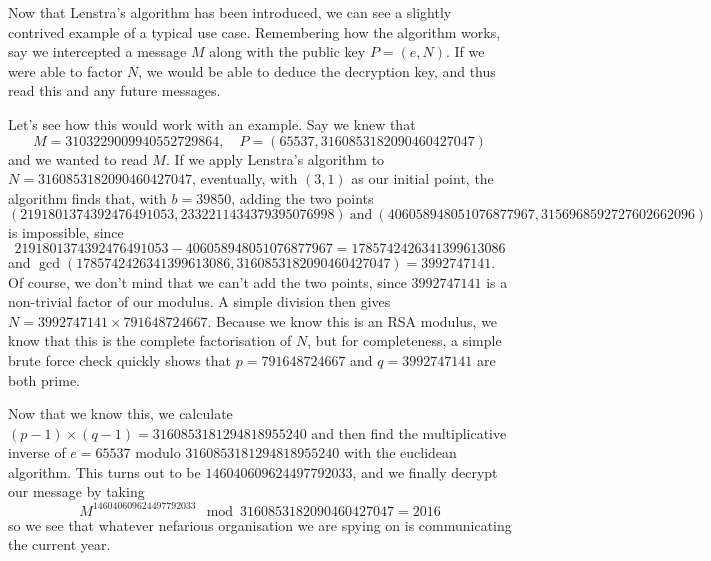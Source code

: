 
Now that Lenstra's algorithm has been introduced, we can see a slightly contrived example of a typical use case. Remembering how the algorithm works, say we intercepted a message $M$ along with the public key $P = (e,N)$. If we were able to factor $N$, we would be able to deduce the decryption key, and thus read this and any future messages. 

Let's see how this would work with an example. Say we knew that
$$ M = 3103229009940552729864,\quad P = (65537, 3160853182090460427047) $$
and we wanted to read $M$. If we apply Lenstra's algorithm to $N = 3160853182090460427047$, eventually, with $(3,1)$ as our initial point, the algorithm finds that, with $b = 39850$, adding the two points
$$(2191801374392476491053, 2332211434379395076998)\ \text{and}\ (406058948051076877967, 3156968592727602662096)$$
is impossible, since 
$$2191801374392476491053-406058948051076877967 = 1785742426341399613086$$ and $\gcd(1785742426341399613086, 3160853182090460427047) = 3992747141$. Of course, we don't mind that we can't add the two points, since $3992747141$ is a non-trivial factor of our modulus. A simple division then gives $N = 3992747141 \times 791648724667$. Because we know this is an RSA modulus, we know that this is the complete factorisation of $N$, but for completeness, a simple brute force check quickly shows that $p = 791648724667$ and $q = 3992747141$ are both prime.

Now that we know this, we calculate $(p-1) \times (q-1) = 3160853181294818955240$ and then find the multiplicative inverse of $e = 65537$ modulo $3160853181294818955240$ with the euclidean algorithm. This turns out to be $146040609624497792033$, and we finally decrypt our message by taking
$$ M^{146040609624497792033} \mod 3160853182090460427047 =2016 $$
so we see that whatever nefarious organisation we are spying on is communicating the current year.
